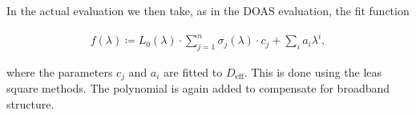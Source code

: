 In the actual evaluation we then take, as in the DOAS evaluation, the fit function

\begin{align*}
  f(\lambda) \coloneqq L_0(\lambda)\cdot\sum_{j=1}^n \sigma_j(\lambda)
  \cdot c_j + \sum_i a_i \lambda^i,
\end{align*}

where the parameters $c_j$ and $a_i$ are fitted to
$D_{\text{eff}}$. This is done using the leas square methods. The
polynomial is again added to compensate for broadband structure.

